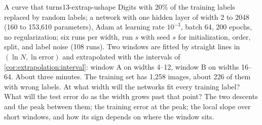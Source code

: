 \begin{refsection}
\begin{lab}{A curve that turns}{13-extrap-ushape}\label{lab:extrapolation:ushape}
 Digits with 20\% of the training labels replaced by random labels; a network with one hidden layer of width 2 to 2048 (160 to 153,610 parameters), Adam at learning rate $10^{-3}$, batch 64, 200 epochs, no regularization; six runs per width, run $s$ with seed $s$ for initialization, order, split, and label noise (108 runs). Two windows are fitted by straight lines in $(\ln N,\ln\text{error})$ and extrapolated with the intervals of \cref{cor:extrapolation:interval}: window A on widths 4--12, window B on widths 16--64. About three minutes.
 The training set has 1,258 images, about 226 of them with wrong labels. At what width will the networks fit every training label? What will the test error do as the width grows past that point?
 The two descents and the peak between them; the training error at the peak; the local slope over short windows, and how its sign depends on where the window sits.
\end{lab}


\end{refsection}
